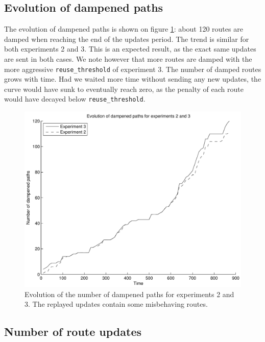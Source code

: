 \documentclass[a4paper,english]{IEEEtran}
\begin{document}
\subsection{Evolution of dampened paths}

The evolution of dampened paths is shown on figure \ref{fig_dampenedpaths}: about 120 routes
are damped when reaching the end of the updates period.
The trend is similar for both experiments 2 and 3.
This is an expected result, as the exact same updates are sent in both cases.
We note however that more routes are damped with the more aggressive \texttt{\small reuse\_threshold} of experiment 3.
The number of damped routes grows with time.
Had we waited more time without sending any new updates, the curve would have sunk to eventually reach zero, as the penalty 
of each route would have decayed below \texttt{\small reuse\_threshold}.

\begin{figure}
\begin{center}
\includegraphics[scale=.5]{img/dampened_paths.pdf}
\end{center}
\caption{Evolution of the number of dampened paths for experiments 2 and 3.
The replayed updates contain some misbehaving routes.}
\label{fig_dampenedpaths}
\end{figure}

\subsection{Number of route updates}
\end{document}
